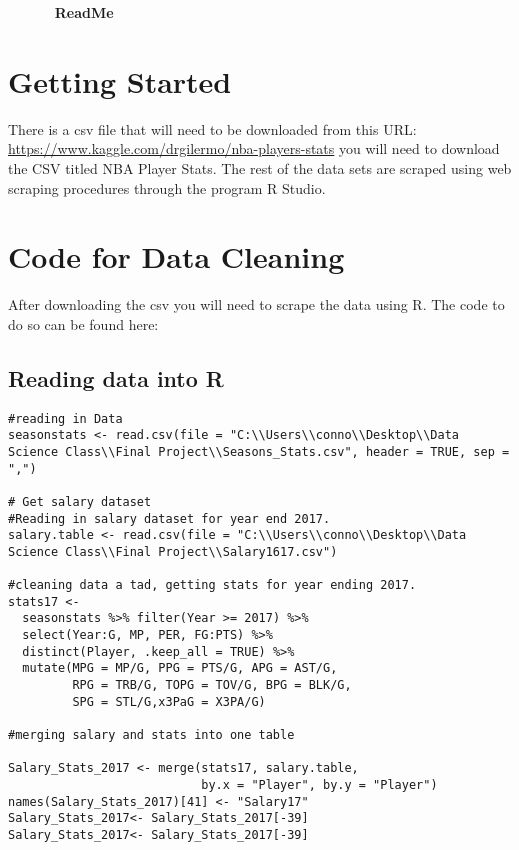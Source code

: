 \documentclass{article}
\begin{document}
\begin{flushleft}
~~~~~~
\textbf{ReadMe}
~~~~~~
\section{Getting Started}
There is a csv file that will need to be downloaded from this URL:
    \url{https://www.kaggle.com/drgilermo/nba-players-stats}
    you will need to download the CSV titled NBA Player Stats. The rest of the data sets are scraped using web scraping procedures through the program R Studio. 
\section{Code for Data Cleaning}
After downloading the csv you will need to scrape the data using R. The code to do so can be found here:
\subsection{Reading data into R}
\begin{singlespace}
\begin{lstlisting}
#reading in Data
seasonstats <- read.csv(file = "C:\\Users\\conno\\Desktop\\Data Science Class\\Final Project\\Seasons_Stats.csv", header = TRUE, sep = ",")

# Get salary dataset 
#Reading in salary dataset for year end 2017.
salary.table <- read.csv(file = "C:\\Users\\conno\\Desktop\\Data Science Class\\Final Project\\Salary1617.csv")

#cleaning data a tad, getting stats for year ending 2017.
stats17 <- 
  seasonstats %>% filter(Year >= 2017) %>% 
  select(Year:G, MP, PER, FG:PTS) %>% 
  distinct(Player, .keep_all = TRUE) %>% 
  mutate(MPG = MP/G, PPG = PTS/G, APG = AST/G, 
         RPG = TRB/G, TOPG = TOV/G, BPG = BLK/G, 
         SPG = STL/G,x3PaG = X3PA/G) 

#merging salary and stats into one table

Salary_Stats_2017 <- merge(stats17, salary.table,
                           by.x = "Player", by.y = "Player")
names(Salary_Stats_2017)[41] <- "Salary17"
Salary_Stats_2017<- Salary_Stats_2017[-39]
Salary_Stats_2017<- Salary_Stats_2017[-39]


\end{lstlisting}
\end{singlespace}
\end{flushleft}
\end{document}
